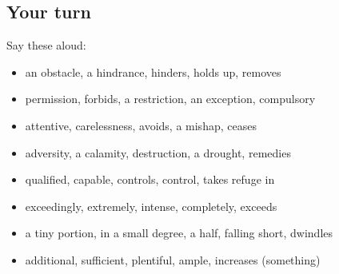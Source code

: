 \subsection*{Your turn}
Say these aloud:

\begin{itemize}
\raggedright
  \item an obstacle, a hindrance, hinders, holds up, removes
  \item permission, forbids, a restriction, an exception, compulsory
  \item attentive, carelessness, avoids, a mishap, ceases
  \item adversity, a calamity, destruction, a drought, remedies
  \item qualified, capable, controls, control, takes refuge in
  \item exceedingly, extremely, intense, completely, exceeds
  \item a tiny portion, in a small degree, a half, falling short, dwindles
  \item additional, sufficient, plentiful, ample, increases (something)
\end{itemize}

